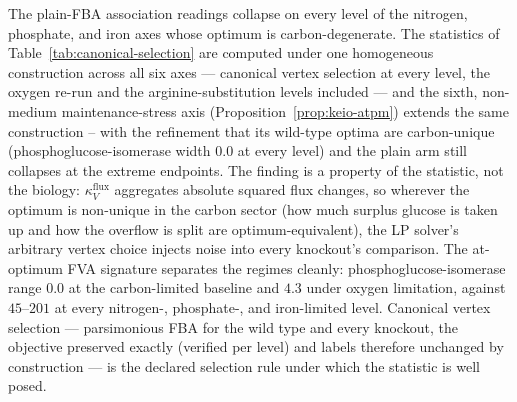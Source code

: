 \documentclass[11pt,a4paper]{article}
\theoremstyle{plain}
\theoremstyle{definition}
\theoremstyle{remark}
\begin{document}
The plain-FBA association readings collapse on every level of the
nitrogen, phosphate, and iron axes whose optimum is
carbon-degenerate. The statistics of
Table~\ref{tab:canonical-selection} are computed under one
homogeneous construction across all six axes --- canonical vertex
selection at every level, the oxygen re-run and the
arginine-substitution levels included --- and the sixth, non-medium
maintenance-stress axis
(Proposition~\ref{prop:keio-atpm}) extends the same construction --
with the refinement that its wild-type optima are carbon-unique
(phosphoglucose-isomerase width $0.0$ at every level) and the
plain arm still collapses at the extreme endpoints. The finding is a
property of the statistic, not the biology:
$\kappa^{\mathrm{flux}}_V$ aggregates absolute squared flux
changes, so wherever the optimum is non-unique in the carbon sector
(how much surplus glucose is taken up and how the overflow is split
are optimum-equivalent), the LP solver's arbitrary vertex choice
injects noise into every knockout's comparison. The at-optimum FVA
signature separates the regimes cleanly: phosphoglucose-isomerase
range $0.0$ at the carbon-limited baseline and $4.3$ under oxygen
limitation, against $45$--$201$ at every nitrogen-, phosphate-,
and iron-limited level. Canonical vertex selection --- parsimonious
FBA for the wild type and every knockout, the objective preserved
exactly (verified per level) and labels therefore unchanged by
construction --- is the declared selection rule under which the
statistic is well posed.
\end{document}

